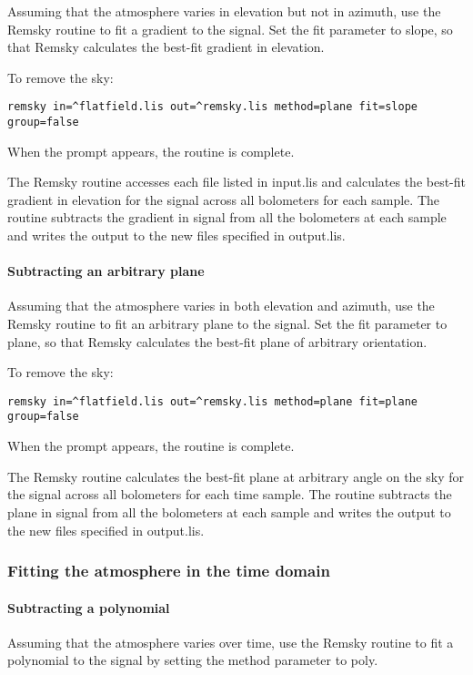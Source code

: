 \documentclass[twoside,11pt]{article}
\renewcommand{\_}{\texttt{\symbol{95}}}
\begin{document}
Assuming that the atmosphere varies in elevation but not in azimuth,
use the Remsky routine to fit a gradient to the signal. Set the fit
parameter to slope, so that Remsky calculates the best-fit gradient in
elevation.

To remove the sky:
\begin{verbatim}
remsky in=^flatfield.lis out=^remsky.lis method=plane fit=slope group=false
\end{verbatim}
When the prompt appears, the routine is complete.

The Remsky routine accesses each file listed in input.lis and
calculates the best-fit gradient in elevation for the signal across
all bolometers for each sample.  The routine subtracts the gradient in
signal from all the bolometers at each sample and writes the output to
the new files specified in output.lis.

\paragraph{Subtracting an arbitrary plane}

Assuming that the atmosphere varies in both elevation and azimuth, use
the Remsky routine to fit an arbitrary plane to the signal. Set the
fit parameter to plane, so that Remsky calculates the best-fit plane
of arbitrary orientation.

To remove the sky:
\begin{verbatim}
remsky in=^flatfield.lis out=^remsky.lis method=plane fit=plane group=false
\end{verbatim}
When the prompt appears, the routine is complete.

The Remsky routine calculates the best-fit plane at arbitrary angle on
the sky for the signal across all bolometers for each time sample. The
routine subtracts the plane in signal from all the bolometers at each
sample and writes the output to the new files specified in output.lis.

\subsubsection{Fitting the atmosphere in the time domain}

\paragraph{Subtracting a polynomial}

Assuming that the atmosphere varies over time, use the Remsky routine
to fit a polynomial to the signal by setting the method parameter to
poly.
\end{document}
